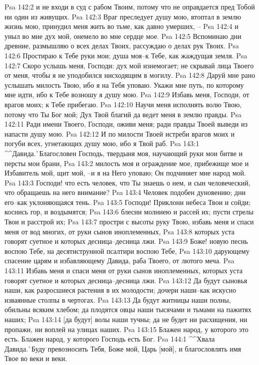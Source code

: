 Psa 142:2  и не входи в суд с рабом Твоим, потому что не оправдается пред Тобой ни один из живущих.
Psa 142:3  Враг преследует душу мою, втоптал в землю жизнь мою, принудил меня жить во тьме, как давно умерших, --
Psa 142:4  и уныл во мне дух мой, онемело во мне сердце мое.
Psa 142:5  Вспоминаю дни древние, размышляю о всех делах Твоих, рассуждаю о делах рук Твоих.
Psa 142:6  Простираю к Тебе руки мои; душа моя--к Тебе, как жаждущая земля.
Psa 142:7  Скоро услышь меня, Господи: дух мой изнемогает; не скрывай лица Твоего от меня, чтобы я не уподобился нисходящим в могилу.
Psa 142:8  Даруй мне рано услышать милость Твою, ибо я на Тебя уповаю. Укажи мне путь, по которому мне идти, ибо к Тебе возношу я душу мою.
Psa 142:9  Избавь меня, Господи, от врагов моих; к Тебе прибегаю.
Psa 142:10  Научи меня исполнять волю Твою, потому что Ты Бог мой; Дух Твой благий да ведет меня в землю правды.
Psa 142:11  Ради имени Твоего, Господи, оживи меня; ради правды Твоей выведи из напасти душу мою.
Psa 142:12  И по милости Твоей истреби врагов моих и погуби всех, угнетающих душу мою, ибо я Твой раб.
Psa 143:1  ^^Давида.^^ Благословен Господь, твердыня моя, научающий руки мои битве и персты мои брани,
Psa 143:2  милость моя и ограждение мое, прибежище мое и Избавитель мой, щит мой, --и я на Него уповаю; Он подчиняет мне народ мой.
Psa 143:3  Господи! что есть человек, что Ты знаешь о нем, и сын человеческий, что обращаешь на него внимание?
Psa 143:4  Человек подобен дуновению; дни его--как уклоняющаяся тень.
Psa 143:5  Господи! Приклони небеса Твои и сойди; коснись гор, и воздымятся;
Psa 143:6  блесни молниею и рассей их; пусти стрелы Твои и расстрой их;
Psa 143:7  простри с высоты руку Твою, избавь меня и спаси меня от вод многих, от руки сынов иноплеменных,
Psa 143:8  которых уста говорят суетное и которых десница--десница лжи.
Psa 143:9  Боже! новую песнь воспою Тебе, на десятиструнной псалтири воспою Тебе,
Psa 143:10  дарующему спасение царям и избавляющему Давида, раба Твоего, от лютого меча.
Psa 143:11  Избавь меня и спаси меня от руки сынов иноплеменных, которых уста говорят суетное и которых десница--десница лжи.
Psa 143:12  Да будут сыновья наши, как разросшиеся растения в их молодости; дочери наши--как искусно изваянные столпы в чертогах.
Psa 143:13  Да будут житницы наши полны, обильны всяким хлебом; да плодятся овцы наши тысячами и тьмами на пажитях наших;
Psa 143:14  [да будут] волы наши тучны; да не будет ни расхищения, ни пропажи, ни воплей на улицах наших.
Psa 143:15  Блажен народ, у которого это есть. Блажен народ, у которого Господь есть Бог.
Psa 144:1  ^^Хвала Давида.^^ Буду превозносить Тебя, Боже мой, Царь [мой], и благословлять имя Твое во веки и веки.
